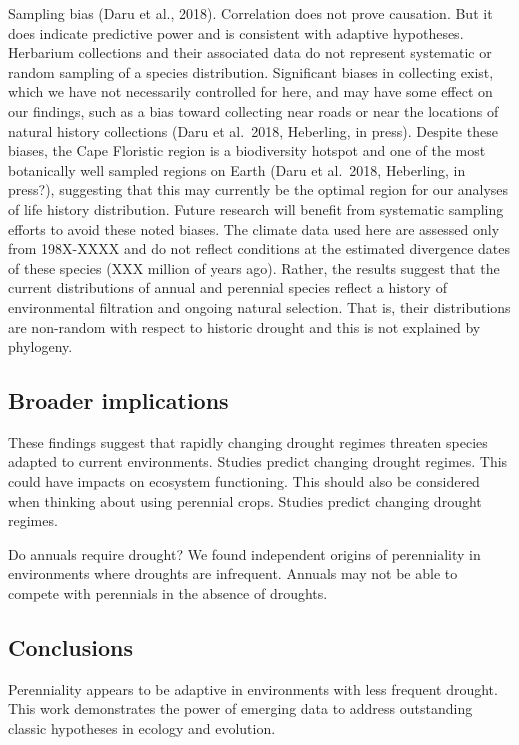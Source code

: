 \documentclass[man,floatsintext]{apa6}
\theoremstyle{definition}
\theoremstyle{definition}
\theoremstyle{definition}
\theoremstyle{remark}
\begin{document}
Sampling bias (Daru et al., 2018). Correlation does not prove causation.
But it does indicate predictive power and is consistent with adaptive
hypotheses. Herbarium collections and their associated data do not
represent systematic or random sampling of a species distribution.
Significant biases in collecting exist, which we have not necessarily
controlled for here, and may have some effect on our findings, such as a
bias toward collecting near roads or near the locations of natural
history collections (Daru et al.~2018, Heberling, in press). Despite
these biases, the Cape Floristic region is a biodiversity hotspot and
one of the most botanically well sampled regions on Earth (Daru et
al.~2018, Heberling, in press?), suggesting that this may currently be
the optimal region for our analyses of life history distribution. Future
research will benefit from systematic sampling efforts to avoid these
noted biases. The climate data used here are assessed only from
198X-XXXX and do not reflect conditions at the estimated divergence
dates of these species (XXX million of years ago). Rather, the results
suggest that the current distributions of annual and perennial species
reflect a history of environmental filtration and ongoing natural
selection. That is, their distributions are non-random with respect to
historic drought and this is not explained by phylogeny.

\hypertarget{broader-implications}{%
\subsection{Broader implications}\label{broader-implications}}

These findings suggest that rapidly changing drought regimes threaten
species adapted to current environments. Studies predict changing
drought regimes. This could have impacts on ecosystem functioning. This
should also be considered when thinking about using perennial crops.
Studies predict changing drought regimes.

Do annuals require drought? We found independent origins of perenniality
in environments where droughts are infrequent. Annuals may not be able
to compete with perennials in the absence of droughts.

\hypertarget{conclusions}{%
\subsection{Conclusions}\label{conclusions}}

Perenniality appears to be adaptive in environments with less frequent
drought. This work demonstrates the power of emerging data to address
outstanding classic hypotheses in ecology and evolution.
\end{document}
